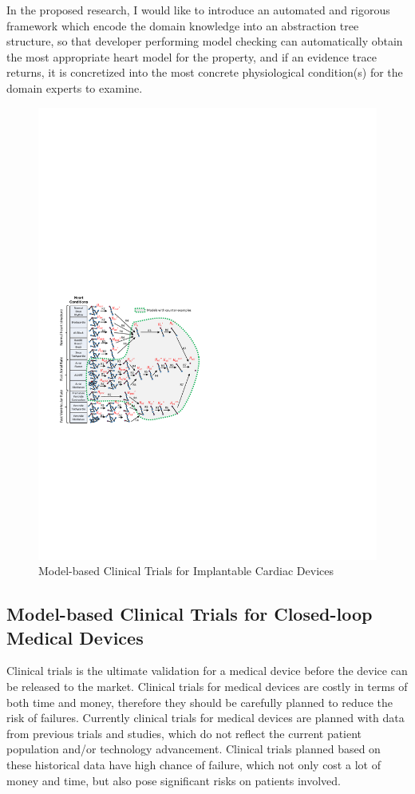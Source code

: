 \documentclass[a4paper]{article}
\begin{document}
In the proposed research, I would like to introduce an automated and rigorous framework which encode the domain knowledge into an abstraction tree structure, so that developer performing model checking can automatically obtain the most appropriate heart model for the property, and if an evidence trace returns, it is concretized into the most concrete physiological condition(s) for the domain experts to examine.
\begin{figure}[t]
	\centering
	\includegraphics[scale=0.7]{figs/abs.pdf}
	\caption{\small Model-based Clinical Trials for Implantable Cardiac Devices}
	\label{fig:mbct}
\end{figure}
\subsection{Model-based Clinical Trials for Closed-loop Medical Devices}
Clinical trials is the ultimate validation for a medical device before the device can be released to the market.
Clinical trials for medical devices are costly in terms of both time and money, therefore they should be carefully planned to reduce the risk of failures.
Currently clinical trials for medical devices are planned with data from previous trials and studies, which do not reflect the current patient population and/or technology advancement.
Clinical trials planned based on these historical data have high chance of failure, which not only cost a lot of money and time, but also pose significant risks on patients involved.
\end{document}
